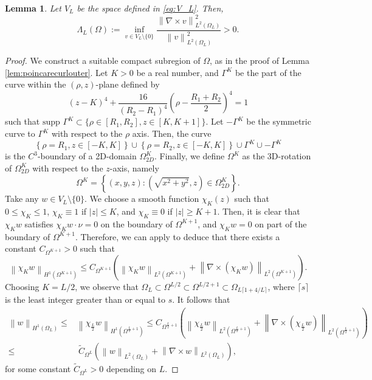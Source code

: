 \documentclass[a4paper,11pt]{amsart}
\newtheorem{lemma}{Lemma}[section]
\numberwithin{equation}{section}
\numberwithin{figure}{section}
\newcommand{\norm}[1]{\left \lVert #1 \right \rVert}
\begin{document}
\begin{lemma}\label{lem:poincarecurlperiodic}
Let $V_L$ be the space defined in \eqref{eq:V_L}. Then,
 \begin{equation}\label{eq:Lambda_L}
		\Lambda_L(\Omega):=\inf_{v\in V_L\setminus\{ 0\} }\frac{\norm{\nabla\times v}_{L^2(\Omega_L)}^2}{\norm{v}_{L^2(\Omega_L)}^2}>0.
	\end{equation}
\end{lemma}
\begin{proof}
We construct a suitable compact subregion of $\Omega$, as in the proof of Lemma \ref{lem:poincarecurlouter}. Let $K>0$ be a real number, and $\Gamma^K$ be the part of the curve within the $(\rho,z)$-plane defined by
	$$(z-K)^4+\frac{16}{(R_2-R_1)^4}\left(\rho-\frac{R_1+R_2}{2}\right)^4=1$$ such that $\text{supp } \Gamma^K\subset \{\rho\in [R_1,R_2],z\in [K,K+1]\}$. Let $-\Gamma^K$ be the symmetric curve to $\Gamma^K$ with respect to the $\rho$ axis. Then, the curve $$\left\{\rho=R_1,z\in[-K,K]\right\}\cup\left\{\rho=R_2,z\in[-K,K]\right\}\cup \Gamma^K\cup -\Gamma^K $$ is the $C^3$-boundary of a 2D-domain $\Omega_{2D}^{K}$. Finally, we define $\Omega^K$ as the 3D-rotation of  $\Omega^K_{2D}$ with respect to the $z$-axis, namely
	\begin{equation}\label{eq:Omega^K2}
		\Omega^K=\left\{(x,y,z):(\sqrt{x^2+y^2},z)\in \Omega^K_{2D}\right\}.
	\end{equation}
	Take any $w\in V_L \setminus \{0\}$. We choose a smooth function $\chi_{K}(z)$ such that $0 \leq \chi_{K} \leq 1$,
	$\chi_{K} \equiv 1$ if $|z| \leq K$, and $\chi_{K} \equiv 0$ if $|z| \geq K+1$.
	Then, it is clear that $\chi_{K} w$ satisfies
	$\chi_{K} w \cdot \nu = 0$ on the boundary of $\Omega^{K+1}$, and
	$\chi_{K} w= 0$ on part of the boundary of $\Omega^{K+1}$.
	Therefore, we can apply \cite[Theorem A.1]{concaenglish} to deduce that there exists
	a constant $C_{\Omega^{K+1}}>0$ such that
	$$\norm{ \chi_{K} w}_{H^1(\Omega^{K+1})}\leq C_{\Omega^{K+1}} (\norm{\chi_{K} w}_{L^2(\Omega^{K+1})}+\norm{\nabla\times (\chi_{K} w)}_{L^2(\Omega^{K+1})}).$$
	Choosing $K=L/2$, we observe that $\Omega_L\subset \Omega^{L/2}\subset \Omega^{L/2+1}\subset \Omega _{L\lceil 1+4/L\rceil }$, where $\lceil s \rceil$ is the least integer greater than or equal to $s$. It follows that
	\begin{equation}\label{eq:concaappendixnorms}
		\begin{aligned}
			\norm{ w}_{H^1(\Omega_L)}\leq & \norm{ \chi_{\frac{L}{2}} w}_{H^1(\Omega^{\frac{L}{2}+1})}\leq C_{\Omega^{\frac{L}{2}+1}} \left(\norm{\chi_{\frac{L}{2}} w}_{L^2(\Omega^{\frac{L}{2}+1})}+\norm{\nabla\times (\chi_{\frac{L}{2}} w)}_{L^2(\Omega^{\frac{L}{2}+1})}\right) \\
			\leq & \ \widetilde{C}_{\Omega^{L}}(\norm{w}_{L^2(\Omega_L)}+\norm{\nabla\times w}_{L^2(\Omega_L)}),
		\end{aligned}
	\end{equation}
	for some constant $\widetilde{C}_{\Omega^L}>0$ depending on $L$.
	

\end{proof}
\end{document}
